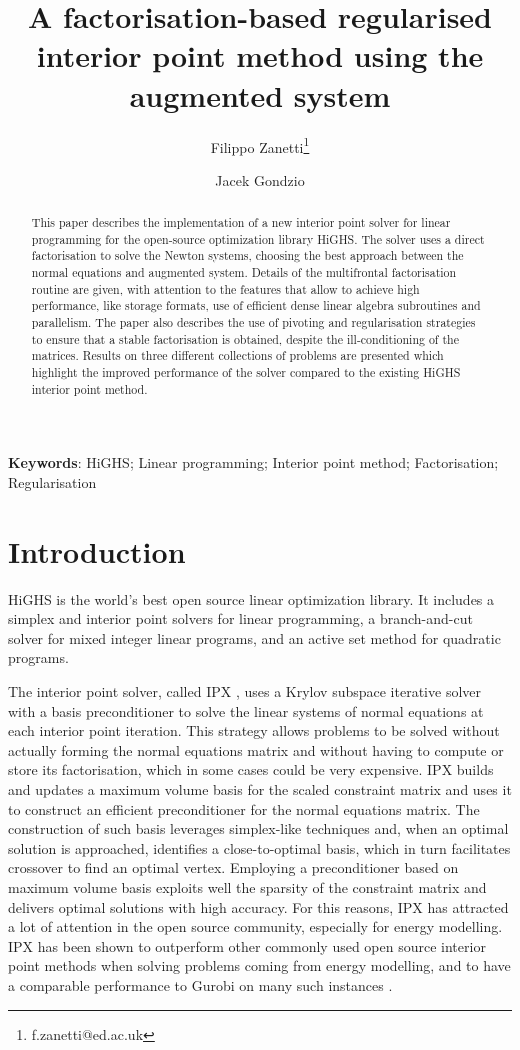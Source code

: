 \documentclass[a4paper]{article}
\title{A factorisation-based regularised interior point method using the augmented system}
\author[1]{Filippo Zanetti\footnote{f.zanetti@ed.ac.uk}}
\author[1]{Jacek Gondzio}
\affil[1]{School of Mathematics, University of Edinburgh, Edinburgh, UK}
\date{}
\newcommand{\0}{\mathbf 0}
\begin{document}
\maketitle

\begin{abstract}
\noindent
This paper describes the implementation of a new interior point solver for linear programming for the open-source optimization library HiGHS. The solver uses a direct factorisation to solve the Newton systems, choosing the best approach between the normal equations and augmented system. Details of the multifrontal factorisation routine are given, with attention to the features that allow to achieve high performance, like storage formats, use of efficient dense linear algebra subroutines and parallelism. The paper also describes the use of pivoting and regularisation strategies to ensure that a stable factorisation is obtained, despite the ill-conditioning of the matrices. Results on three different collections of problems are presented which highlight the improved performance of the solver compared to the existing HiGHS interior point method.
\end{abstract}

\noindent\textbf{Keywords}: HiGHS; Linear programming; Interior point method; Factorisation; Regularisation

\section{Introduction}
\label{intro}
HiGHS is the world's best open source linear optimization library. It includes a simplex \cite{HuaHal:highs} and interior point \cite{SchGon:basisIPM} solvers for linear programming, a branch-and-cut solver for mixed integer linear programs, and an active set method for quadratic programs.

The interior point solver, called IPX \cite{SchGon:basisIPM}, uses a Krylov subspace iterative solver with a basis preconditioner to solve the linear systems of normal equations at each interior point iteration. This strategy allows problems to be solved without actually forming the normal equations matrix and without having to compute or store its factorisation, which in some cases could be very expensive. 
IPX builds and updates a maximum volume basis for the scaled constraint matrix and uses it to construct an efficient preconditioner for the normal equations matrix. The construction of such basis leverages simplex-like techniques and, when an optimal solution is approached, identifies a close-to-optimal basis, which in turn facilitates crossover to find an optimal vertex. Employing a preconditioner based on maximum volume basis exploits well the sparsity of the constraint matrix and delivers optimal solutions with high accuracy.
For this reasons, IPX has attracted a lot of attention in the open source community, especially for energy modelling. IPX has been shown to outperform other commonly used open source interior point methods when solving problems coming from energy modelling, and to have a comparable performance to Gurobi \cite{gurobi} on many such instances \cite{openenergy,ParHalJenBro:highs}. 
\end{document}
